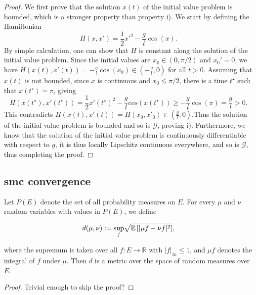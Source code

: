 \begin{proof}
  We first prove that the solution $x(t)$ of the initial value problem is bounded, which is a stronger property than property i). We start by defining the Hamiltonian
  \begin{equation*}
    H(x, x') = \frac12 x'^2 - \frac{g}{l}\cos(x).
  \end{equation*}
  By simple calculation, one can show that $H$ is constant along the solution of the initial value problem. Since the initial values are $x_0 \in (0, \pi/2)$ and $x_0' = 0$, we have $H(x(t), x'(t)) = -\frac{g}{l}\cos(x_0) \in (-\frac{g}{l}, 0)$ for all $t > 0$. Assuming that $x(t)$ is not bounded, since $x$ is continuous and $x_0 \le \pi/2$, there is a time $t^\star$ such that $x(t^\star) = \pi$, giving
  \begin{equation*}
    H(x(t^\star), x'(t^\star)) = \frac12 x'(t^\star)^2 - \frac{g}{l}cos(x(t^\star)) \ge -\frac{g}{l}\cos(\pi) = \frac{g}{l} > 0.
  \end{equation*}
  This contradicts $H(x(t), x'(t)) = H(x_0, x'_0) \in (\frac{g}{l}, 0)$.Thus the solution of the initial value problem is bounded and so is $\mathcal{G}$, proving i).
  Furthermore, we know that the solution of the initial value problem is continuously differentiable with respect to $g$, it is thus locally Lipschitz continuous everywhere, and so is $\mathcal{G}$, thus completing the proof.
\end{proof}

\subsection{smc convergence}

\begin{lemma}
  Let $P(E)$ denote the set of all probability measures on $E$. For every $\mu$ and $\nu$ random variables with values in $P(E)$, we define

  \begin{equation*}
    d(\mu, \nu) := \underset{f}{\text{sup}} \sqrt{\mathbb{E}\left[|\mu f - \nu f|^2\right]},
  \end{equation*}

  where the supremum is taken over all $f : E \rightarrow \mathbb{R}$ with $|f|_\infty \le 1$, and $\mu f$ denotes the integral of $f$ under $\mu$. Then $d$ is a metric over the space of random measures over $E$.
\end{lemma}

\begin{proof} Trivial enough to skip the proof?
\end{proof}

